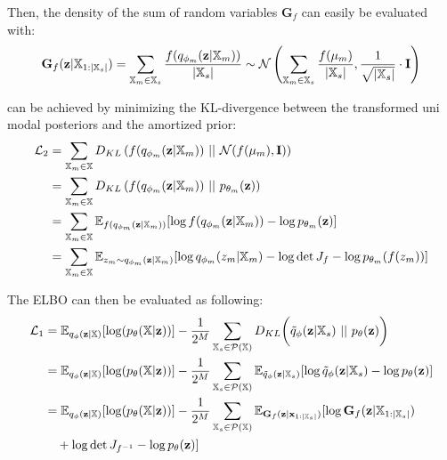 Then, the density of the sum of random variables $\textbf{G}_f$ can easily be evaluated with:
\begin{equation}
    \textbf{G}_f(\textbf{z}|\mathbb{X}_{1:|\mathbb{X}_s|}) =\sum _{\mathbb{X}_m \in \mathbb{X}_s} \frac{f(q_{\phi_m}(\textbf{z}|\mathbb{X}_m))}{|\mathbb{X}_s|} \sim \mathcal{N} \left(  \sum _{\mathbb{X}_m \in \mathbb{X}_s} \frac{f(\mu_m)}{|\mathbb{X}_s|}, \frac{1}{\sqrt{|\mathbb{X}_s|}}  \cdot \textbf{I} \right)
\end{equation}

 can be achieved by minimizing the KL-divergence between the transformed uni modal posteriors and the amortized prior:
\begin{equation}
    \begin{split}
        \mathcal{L}_2 &= \sum _{\xsetm \in \xset} D_{KL}\left( f(\unimodalpost)\ ||\ \mathcal{N}(f(\mu_m), \textbf{I}) \right)\\
        &= \sum _{\xsetm \in \xset} D_{KL}\left( f(\unimodalpost)\ ||\ p_{\theta_m}(\textbf{z}) \right)\\
        &=  \sum _{\xsetm \in \xset} \mathbb{E}_{f(\unimodalpost)} [\log f(\unimodalpost) - \log p_{\theta_m}(\textbf{z})]\\
        &=  \sum _{\xsetm \in \xset} \mathbb{E}_{z_m \sim \unimodalpost} [\log q_{\phi_m}(z_m|\xsetm) - \log \det J_f  - \log p_{\theta_m}(f(z_m))]\\
    \end{split}
\end{equation}

The ELBO can then be evaluated as following:
\begin{equation}
    \begin{split}
        \mathcal{L}_1 &=  \mathbb{E}_{q_{\phi}(\textbf{z}|\mathbb{X})}[\log (p_{\theta}(\mathbb{X}|\textbf{z}))] -  \frac{1}{2^M} \sum _{\mathbb{X}_s \in \mathcal{P}(\mathbb{X})} D_{KL}\biggl( \tilde{q}_{\phi}(\textbf{z}|\mathbb{X}_s)\ ||\ p_{\theta}(\textbf{z})\biggr)\\
        &= \mathbb{E}_{q_{\phi}(\textbf{z}|\mathbb{X})}[\log (p_{\theta}(\mathbb{X}|\textbf{z}))] - \frac{1}{2^M} \sum _{\mathbb{X}_s \in \mathcal{P}(\mathbb{X})} \mathbb{E}_{\tilde{q}_{\phi}(\textbf{z}|\mathbb{X}_s)}[\log \tilde{q}_{\phi}(\textbf{z}|\mathbb{X}_s) - \log p_{\theta}(\textbf{z}) ]\\
        &= \mathbb{E}_{q_{\phi}(\textbf{z}|\mathbb{X})}[\log (p_{\theta}(\mathbb{X}|\textbf{z}))] - \frac{1}{2^M} \sum _{\mathbb{X}_s \in \mathcal{P}(\mathbb{X})} \mathbb{E}_{\textbf{G}_f(\textbf{z}|\textbf{x}_{1:|\xsubset|})}[\log \textbf{G}_f(\textbf{z}|\xset_{1:|\xsubset|})\\
        &\quad + \log \det J_{f^{-1}}- \log p_{\theta}(\textbf{z}) ]
    \end{split}
\end{equation}


